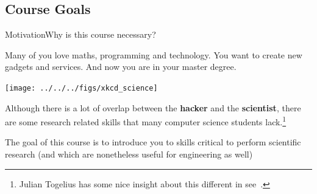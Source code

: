 \documentclass[t]{beamer}
\begin{document}
\subsection{Course Goals}

\begin{ftst}
  {Motivation}{Why is this course necessary?}  
  
  Many of you love maths, programming and technology. You want to
  create new gadgets and services. And now you are in your master
  degree.

  \hfill\texttt{[image: ../../../figs/xkcd\_science]}
  
  Although there is a lot of overlap between the {\bf hacker} and the
  {\bf scientist}, there are some research related skills that many
  computer science students lack.\footnote{Julian Togelius has some
    nice insight about this different in
    see~\href{http://togelius.blogspot.jp/2016/04/the-differences-between-tinkering-and.html}{}.}
  
  \vone

  The goal of this course is to introduce you to skills critical to
  perform scientific research (and which are nonetheless useful for
  engineering as well)
\end{ftst}
\end{document}
